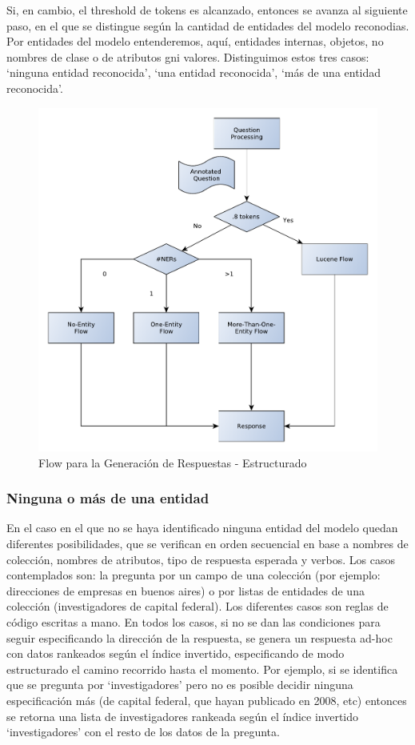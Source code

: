 Si, en cambio, el threshold de tokens es alcanzado, entonces se avanza al siguiente paso, en el que se distingue según la cantidad de entidades del modelo reconodias. Por entidades del modelo entenderemos, aquí, entidades internas, objetos, no nombres de clase o de atributos gni valores. Distinguimos estos tres casos: `ninguna entidad reconocida', `una entidad reconocida', `más de una entidad reconocida'.



\begin{figure}[H]
  \centering
    \includegraphics[scale=0.5]{graficos/AnswerRetrievalFlowEstructurado}
  \caption{Flow para la Generación de Respuestas - Estructurado}
  \label{fig:AnswerRetrievalFlowEstructurado}
\end{figure}

\subsubsection*{Ninguna o más de una entidad}
En el caso en el que no se haya identificado ninguna entidad del modelo quedan diferentes posibilidades, que se verifican en orden secuencial en base a nombres de colección, nombres de atributos, tipo de respuesta esperada y verbos. Los casos contemplados son: la pregunta por un campo de una colección (por ejemplo: direcciones de empresas en buenos aires) o por listas de entidades de una colección (investigadores de capital federal). Los diferentes casos son reglas de código escritas a mano. En todos los casos, si no se dan las condiciones para seguir especificando la dirección de la respuesta, se genera un respuesta ad-hoc con datos rankeados según el índice invertido, especificando de modo estructurado el camino recorrido hasta el momento. Por ejemplo, si se identifica que se pregunta por `investigadores' pero no es posible decidir ninguna especificación más (de capital federal, que hayan publicado en 2008, etc) entonces se retorna una lista de investigadores rankeada según el índice invertido `investigadores' con el resto de los datos de la pregunta. 

